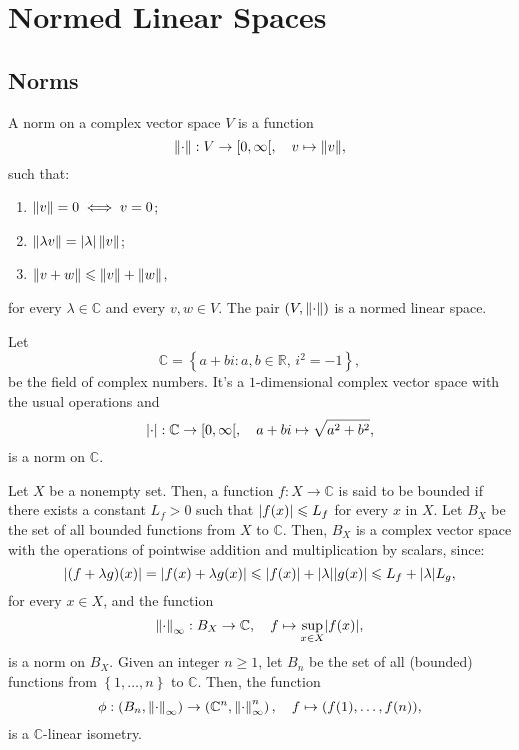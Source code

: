 \section{Normed Linear Spaces}\label{sec:normed-linear-spaces}

\subsection{Norms}\label{subsec:norms}

\begin{definition}\label{def:normed-linear-spaces}
  A norm on a complex vector space \(V\) is a function
  \[
    \norm{\cdot}:V\to\rinterval{0}{\infty},\quad{v\mapsto\norm{v}},
  \]
  such that:
  \begin{enumerate}
    \item
      \(\left\lVert{v}\right\rVert=0\iff{v=0}\);
    \item
      \(\left\lVert{\lambda{v}}\right\rVert=\lvert{\lambda}\rvert\left\lVert{v}\right\rVert\);
    \item
      \(\left\lVert{v+w}\right\rVert\leqslant{\left\lVert{v}\right\rVert+\left\lVert{w}\right\rVert}\),
  \end{enumerate}
  for every \(\lambda\in{\mathbb{C}}\) and every \(v,w\in{V}\). The pair
  \((V,\left\lVert{\cdot}\right\rVert)\) is a normed linear space.
\end{definition}

\begin{example}\label{the-complex-field-is-a-normed-linear-space}
  Let
  \[
    \mathbb{C}=\left\{a+bi:a,b\in\mathbb{R},\,i^{2}=-1\right\},
  \]
  be the field of complex numbers. It's a \(1\)-dimensional complex vector
  space with the usual operations and
  \[
    \abs{\cdot}:\mathbb{C}\to\rinterval{0}{\infty},\quad
    a+bi\mapsto\sqrt{a^{2}+b^{2}},
  \]
  is a norm on \(\mathbb{C}\).
\end{example}

\begin{example}\label{ex:bouded-functions}
  Let $ X $ be a nonempty set. Then, a function $ f:X\to\mathbb{C} $ is said to
  be bounded if there exists a constant $ L_{f} > 0 $ such that $ \lvert{f(x)}\rvert
  \leqslant L_{f} $ for every $ x $ in $ X $. Let $ B_{X} $ be the set of all
  bounded functions from $ X $ to $ \mathbb{C} $. Then, $ B_{X} $ is a complex
  vector space with the operations of pointwise addition and multiplication by
  scalars, since:
  \[
    \lvert{(f+\lambda{g})(x)}\rvert
    =
    \lvert{f(x)+\lambda{g(x)}}\rvert
    \leqslant
    \lvert{f(x)}\rvert+\lvert{\lambda}\rvert\lvert{g(x)}\rvert
    \leqslant
    L_{f}+\lvert{\lambda}\rvert L_{g},
  \]
  for every \(x\in{X}\), and the function
  \[
    \left\lVert{\cdot}\right\rVert_{\infty}:B_{X}\to\mathbb{C},\quad
    f\mapsto\sup\limits_{x\in{X}}\lvert{f(x)}\rvert,
  \]
  is a norm on \(B_{X}\). Given an integer \(n\geqslant{1}\), let \(B_{n}\) be
  the set of all (bounded) functions from \(\left\{1,\ldots,n\right\}\) to
  \(\mathbb{C}\). Then, the function
  \[
    \phi:
    \left(
    B_{n},
    \left\lVert{\cdot}\right\rVert_{\infty}
    \right)
    \to
    \left(
    \mathbb{C}^{n},
    \left\lVert{\cdot}\right\rVert^{n}_{\infty}
    \right),
    \quad
    f\mapsto{(f(1),\ldots,f(n))},
  \]
  is a \(\mathbb{C}\)-linear isometry.
\end{example}

